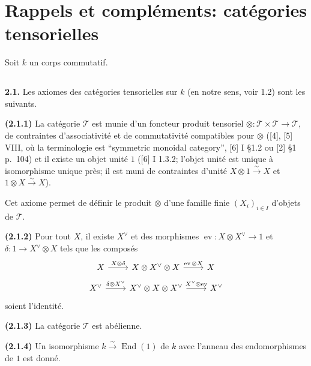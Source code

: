 \documentclass[12pt,a4paper]{article}
\theoremstyle{plain}
\theoremstyle{definition}
\theoremstyle{remark}
\DeclareMathOperator{\End}{End}
\DeclareMathOperator{\ev}{ev}
\begin{document}
\section{Rappels et compléments: catégories tensorielles}

Soit $k$ un corps commutatif.

\subsection{}

\textbf{2.1.} Les axiomes des catégories tensorielles sur $k$ (en notre sens, voir 1.2) sont les suivants.

\textbf{(2.1.1)} La catégorie $\mathcal{T}$ est munie d'un foncteur produit tensoriel $\otimes : \mathcal{T} \times \mathcal{T} \to \mathcal{T}$, de contraintes d'associativité et de commutativité compatibles pour $\otimes$ ([4], [5] VIII, où la terminologie est ``symmetric monoidal category'', [6] I \S 1.2 ou [2] \S 1 p.~104) et il existe un objet unité $1$ ([6] I 1.3.2; l'objet unité est unique à isomorphisme unique près; il est muni de contraintes d'unité $X \otimes 1 \xrightarrow{\sim} X$ et $1 \otimes X \xrightarrow{\sim} X$).

Cet axiome permet de définir le produit $\otimes$ d'une famille finie $(X_i)_{i \in I}$ d'objets de $\mathcal{T}$.

\textbf{(2.1.2)} Pour tout $X$, il existe $X^\vee$ et des morphismes $\ev : X \otimes X^\vee \to 1$ et $\delta : 1 \to X^\vee \otimes X$ tels que les composés
\[
\begin{tikzcd}
X \arrow[r, "X \otimes \delta"] & X \otimes X^\vee \otimes X \arrow[r, "\ev \otimes X"] & X
\end{tikzcd}
\]
\[
\begin{tikzcd}
X^\vee \arrow[r, "\delta \otimes X^\vee"] & X^\vee \otimes X \otimes X^\vee \arrow[r, "X^\vee \otimes \ev"] & X^\vee
\end{tikzcd}
\]
soient l'identité.

\textbf{(2.1.3)} La catégorie $\mathcal{T}$ est abélienne.

\textbf{(2.1.4)} Un isomorphisme $k \xrightarrow{\sim} \End(1)$ de $k$ avec l'anneau des endomorphismes de $1$ est donné.

\subsection{}
\end{document}

